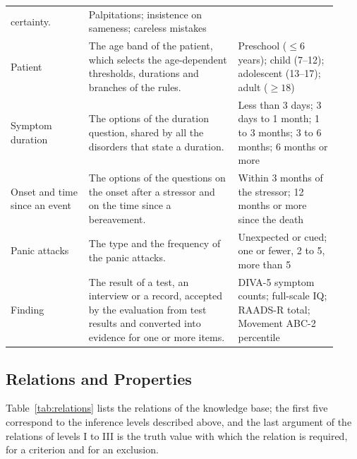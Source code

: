 \begin{longtable}{@{}p{0.22\linewidth} p{0.42\linewidth} p{0.28\linewidth}@{}}
certainty. &
Palpitations; insistence on sameness; careless mistakes \\
\addlinespace
Patient &
The age band of the patient, which selects the age-dependent thresholds,
durations and branches of the rules. &
Preschool ($\le 6$ years); child (7--12); adolescent (13--17); adult
($\ge 18$) \\
\addlinespace
Symptom duration &
The options of the duration question, shared by all the disorders that state a
duration. &
Less than 3 days; 3 days to 1 month; 1 to 3 months; 3 to 6 months; 6 months or
more \\
\addlinespace
Onset and time since an event &
The options of the questions on the onset after a stressor and on the time
since a bereavement. &
Within 3 months of the stressor; 12 months or more since the death \\
\addlinespace
Panic attacks &
The type and the frequency of the panic attacks. &
Unexpected or cued; one or fewer, 2 to 5, more than 5 \\
\addlinespace
Finding &
The result of a test, an interview or a record, accepted by the evaluation from
test results and converted into evidence for one or more items. &
DIVA-5 symptom counts; full-scale IQ; RAADS-R total; Movement ABC-2
percentile \\
\end{longtable}


\subsection{Relations and Properties}

Table~\ref{tab:relations} lists the relations of the knowledge base; the first
five correspond to the inference levels described above, and the last argument
of the relations of levels I to III is the truth value with which the relation
is required,  for a criterion and  for an exclusion.

